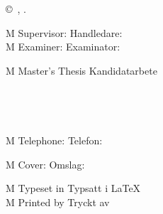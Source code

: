 \begingroup %
\newpage
\thispagestyle{empty}
\vspace*{4.5cm}
\thesisImprintTitle\\
\thesisImprintSubtitle\\
\thesisAuthor \setlength{\parskip}{1cm}

\copyright~\thesisAuthor, \thesisYear. \setlength{\parskip}{1cm}

\if\thesisType M
    Supervisor:
\else
    Handledare:
\fi
\thesisSupervisor\\
\if\thesisType M
    Examiner:
\else
    Examinator:
\fi
\thesisExaminer \setlength{\parskip}{1cm}

\if\thesisType M
    Master's Thesis
\else
    Kandidatarbete
\fi
\thesisYear\\
\thesisDepartment\\
\ifx\thesisGroup\undefined
\else
\thesisGroup\\
\fi
\thesisUniversity\\
\thesisImprintLocation\\
\if\thesisType M
    Telephone:
\else
    Telefon:
\fi
\thesisUniversityTel \setlength{\parskip}{0.5cm}

\vfill
\ifx\thesisCoverFigure\undefined
\else
    \if\thesisType M
        Cover:
    \else
        Omslag:
    \fi
    \thesisCoverFigureCaption
    \setlength{\parskip}{0.5cm}
\fi

\if\thesisType M
    Typeset in
\else
    Typsatt i
\fi
\LaTeX\\
\ifx\thesisPrintedBy\undefined
\else
    \if\thesisType M
        Printed by
    \else
        Tryckt av
    \fi
    \thesisPrintedBy\\
\fi
\thesisLocation\ \thesisYear
\endgroup
